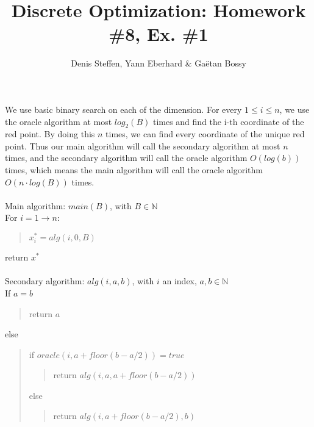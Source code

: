 \documentclass[a4paper,11pt,french]{article}
\title{Discrete Optimization: Homework \#8, Ex. \#1}
\author{Denis Steffen, Yann Eberhard \& Gaëtan Bossy}
\begin{document}
    
    \maketitle
We use basic binary search on each of the dimension. For every $1\leq i\leq n$, we use the oracle algorithm at most $log_2(B)$ times and find the i-th coordinate of the red point. By doing this $n$ times, we can find every coordinate of the unique red point. Thus our main algorithm will call the secondary algorithm at most $n$ times, and the secondary algorithm will call the oracle algorithm %
$O(log(b))$ times, which means the main algorithm will call the oracle algorithm $O(n\cdot log(B))$ times.\\ \\
Main algorithm: $main(B)$, with $B\in\mathbb{N}$\\
For $i=1\rightarrow n$:
	 \begin{verse}
	 $x^*_i=alg(i,0,B)$
	 \end{verse}
return $x^*$\\ \\
Secondary algorithm: $alg(i,a,b)$, with $i$ an index, $a,b\in\mathbb{N}$\\
If $a=b$
\begin{verse}
return $a$
\end{verse}
else
\begin{verse}
 if $oracle(i,a+floor(b-a/2))=true$ 
 \begin{verse}
 return $alg(i,a,a+floor(b-a/2))$ 
 \end{verse}
 else
 \begin{verse} return $alg(i,a+floor(b-a/2),b)$
 \end{verse}
\end{verse}
  
\end{document}
